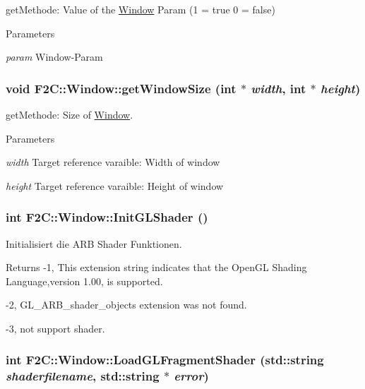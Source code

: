 getMethode: Value of the \hyperlink{class_f2_c_1_1_window}{Window} Param (1 = true 0 = false) 
\begin{DoxyParams}{Parameters}
\item[{\em param}]Window-\/Param \end{DoxyParams}
\hypertarget{class_f2_c_1_1_window_ad522ef19b23fc5e75a3194c8edbf618d}{
\subsubsection[{getWindowSize}]{\setlength{\rightskip}{0pt plus 5cm}void F2C::Window::getWindowSize (int $\ast$ {\em width}, \/  int $\ast$ {\em height})}}
\label{class_f2_c_1_1_window_ad522ef19b23fc5e75a3194c8edbf618d}


getMethode: Size of \hyperlink{class_f2_c_1_1_window}{Window}. 
\begin{DoxyParams}{Parameters}
\item[{\em width}]Target reference varaible: Width of window \item[{\em height}]Target reference varaible: Height of window \end{DoxyParams}
\hypertarget{class_f2_c_1_1_window_a085055cbf85676cd03f38b1105afb669}{
\subsubsection[{InitGLShader}]{\setlength{\rightskip}{0pt plus 5cm}int F2C::Window::InitGLShader ()}}
\label{class_f2_c_1_1_window_a085055cbf85676cd03f38b1105afb669}


Initialisiert die ARB Shader Funktionen. \begin{DoxyReturn}{Returns}
-\/1, This extension string indicates that the OpenGL Shading Language,version 1.00, is supported. 

-\/2, GL\_\-ARB\_\-shader\_\-objects extension was not found. 

-\/3, not support shader. 
\end{DoxyReturn}
\hypertarget{class_f2_c_1_1_window_a017173888582ad09c18f85ceedaee593}{
\subsubsection[{LoadGLFragmentShader}]{\setlength{\rightskip}{0pt plus 5cm}int F2C::Window::LoadGLFragmentShader (std::string {\em shaderfilename}, \/  std::string $\ast$ {\em error})}}
\label{class_f2_c_1_1_window_a017173888582ad09c18f85ceedaee593}


